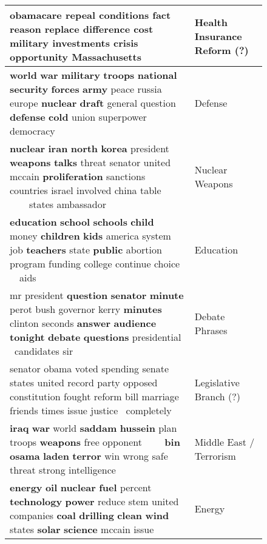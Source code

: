 \begin{figure*}
\begin{flushleft}
\begin{supertabular}{|m{4.8087597in}|m{1.1906599in}|}
{\textbf{obamacare} repeal conditions fact reason replace difference \textbf{cost} military investments crisis
opportunity \textbf{Massachusetts}} &
{ Health Insurance Reform (?)}\\\hline
{ \textbf{world} \textbf{war} \textbf{military} \textbf{troops} \textbf{national}
\textbf{security} \textbf{forces} \textbf{army} peace russia europe \textbf{nuclear} \textbf{draft} general question
\textbf{defense} \textbf{cold} union superpower democracy} &
{ Defense}\\\hline
{ \textbf{nuclear} \textbf{iran} \textbf{north} \textbf{korea} president \textbf{weapons}
\textbf{talks} threat senator united mccain \textbf{proliferation} sanctions countries israel involved china table
\ \ \ \ states ambassador} &
{ Nuclear Weapons}\\\hline
{ \textbf{education} \textbf{school} \textbf{schools} \textbf{child} money \textbf{children}
\textbf{kids} america system job \textbf{teachers} state \textbf{public} abortion program funding college continue
choice \ \ aids} &
{ Education}\\\hline
{ mr president \textbf{question} \textbf{senator} \textbf{minute} perot bush governor kerry
\textbf{minutes} clinton seconds \textbf{answer} \textbf{audience} \textbf{tonight} \textbf{debate} \textbf{questions}
presidential \ candidates sir} &
{ Debate Phrases}\\\hline
{ senator obama voted spending senate states united record party opposed constitution fought
reform bill marriage friends times issue justice \ completely} &
{ Legislative Branch (?)}\\\hline
{ \textbf{iraq} \textbf{war} world \textbf{saddam} \textbf{hussein} plan troops \textbf{weapons}
free opponent \ \ \ \ \textbf{bin} \textbf{osama} \textbf{laden} \textbf{terror} win wrong safe threat strong
intelligence} &
{ Middle East / Terrorism}\\\hline
{ \textbf{energy} \textbf{oil} \textbf{nuclear} \textbf{fuel} percent \textbf{technology}
\textbf{power} reduce stem united companies \textbf{coal} \textbf{drilling} \textbf{clean} \textbf{wind} states
\textbf{solar} \textbf{science} mccain issue} &
{ Energy}\\\hline

\end{supertabular}
\end{flushleft}
\end{figure*}
